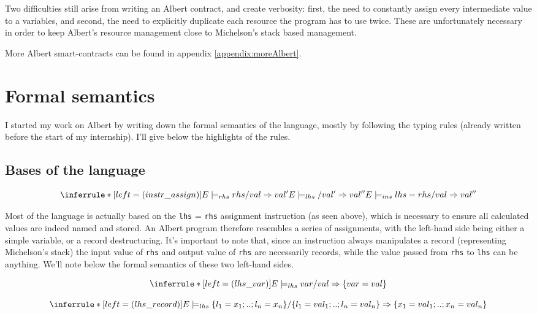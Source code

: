 \documentclass{report}
\begin{document}
Two difficulties still arise from writing an Albert contract, and create verbosity: first, the need to constantly assign every intermediate value to a variables, and second, the need to explicitly duplicate each resource the program has to use twice. These are unfortunately necessary in order to keep Albert's resource management close to Michelson's stack based management.

More Albert smart-contracts can be found in appendix \ref{appendix:moreAlbert}.

\section{Formal semantics}
\label{albertSemantics}

I started my work on Albert by writing down the formal semantics of the language, mostly by following the typing rules (already written before the start of my internship). I'll give below the highlights of the rules.

\subsection{Bases of the language}

$$
\inferrule* [left=(instr\_assign)]
    { E \models_{rhs} rhs / val \Rightarrow val' \\ E \models_{lhs} / val' \Rightarrow val'' }
    { E \models_{ins} lhs = rhs / val \Rightarrow val'' }
$$

Most of the language is actually based on the \texttt{lhs} = \texttt{rhs} assignment instruction (as seen above), which is necessary to ensure all calculated values are indeed named and stored. An Albert program therefore resembles a series of assignments, with the left-hand side being either a simple variable, or a record destructuring. It's important to note that, since an instruction always manipulates a record (representing Michelson's stack) the input value of \lstinline{rhs} and output value of \lstinline{rhs} are necessarily records, while the value passed from \lstinline{rhs} to \lstinline{lhs} can be anything. We'll note below the formal semantics of these two left-hand sides.

$$
\inferrule* [left=(lhs\_var)]
    { }
    { E \models_{lhs} var / val \Rightarrow \{ var = val \} }
$$

$$
\inferrule* [left=(lhs\_record)]
    { }
    { E \models_{lhs} \{ l_1 = x_1 ; .. ; l_n = x_n \} / \{ l_1 = val_1 ; .. ; l_n = val_n \} \Rightarrow \{ x_1 = val_1 ; .. ; x_n = val_n \} }
$$
\end{document}
